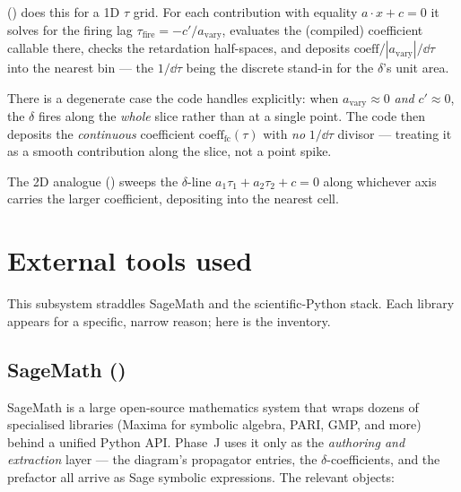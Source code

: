  ()
does this for a 1D $\tau$ grid. For each contribution with equality
$a\cdot x + c = 0$ it solves for the firing lag $\tau_{\text{fire}} =
-c'/a_{\text{vary}}$, evaluates the (compiled) coefficient callable there, checks
the retardation half-spaces, and deposits $\text{coeff}/|a_{\text{vary}}|/\dd\tau$
into the nearest bin --- the $1/\dd\tau$ being the discrete stand-in for the
$\delta$'s unit area.

\begin{gotcha}
There is a degenerate case the code handles explicitly: when $a_{\text{vary}}
\approx 0$ \emph{and} $c'\approx 0$, the $\delta$ fires along the \emph{whole}
slice rather than at a single point. The code then deposits the
\emph{continuous} coefficient $\text{coeff}_{\text{fc}}(\tau)$ with \emph{no}
$1/\dd\tau$ divisor --- treating it as a smooth contribution along the slice, not a
point spike.
\end{gotcha}

The 2D analogue 
() sweeps the $\delta$-line
$a_1\tau_1 + a_2\tau_2 + c = 0$ along whichever axis carries the larger
coefficient, depositing into the nearest cell.

\section{External tools used}\label{sec:tools}

This subsystem straddles SageMath and the scientific-Python stack. Each library
appears for a specific, narrow reason; here is the inventory.

\subsection{SageMath ()}

SageMath is a large open-source mathematics system that wraps dozens of
specialised libraries (Maxima for symbolic algebra, PARI, GMP, and more) behind a
unified Python API. Phase~J uses it only as the \emph{authoring and extraction}
layer --- the diagram's propagator entries, the $\delta$-coefficients, and the
prefactor all arrive as Sage symbolic expressions. The relevant objects:

